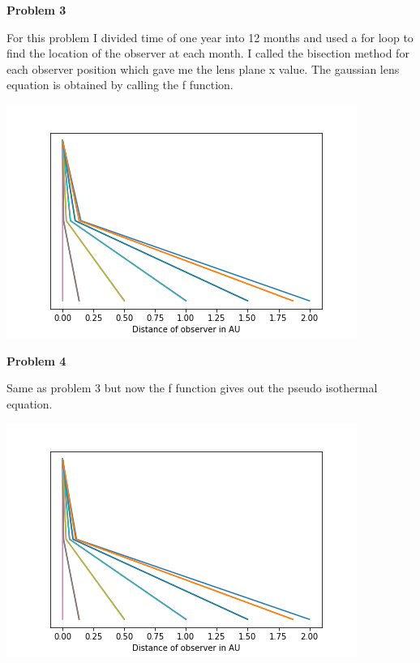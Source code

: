 \documentclass{article}
\begin{document}
\vspace{5em}
\textbf{Problem 3}
\vspace{1.5em}

For this problem I divided time of one year into 12 months and used a for loop to find the location of the observer at each month. I called the bisection method for each observer position which gave me the lens plane x value. The gaussian lens equation is obtained by calling the f function.
\vspace{1.5em}
\begin{center}
 \includegraphics[scale=0.3]{Images/HW_1_pb3}
 \end{center}
 
\vspace{1.5em}
 
\textbf{Problem 4}\vspace{1.5em}

Same as problem 3 but now the f function gives out the pseudo isothermal equation.
\vspace{1.5em}
\begin{center}
 \includegraphics[scale=0.3]{Images/HW_1_pb4}
 \end{center}
 
\end{document}
